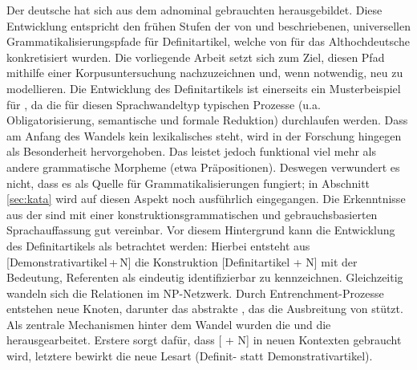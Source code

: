 Der deutsche  hat sich aus dem adnominal gebrauchten   herausgebildet. Diese Entwicklung entspricht den frühen Stufen der von \textcite{Greenberg1978} und \textcite{Lehmann2015} beschriebenen, universellen Grammatikalisierungspfade  für Definitartikel, welche von \textcite{Schmuck2014} für das Althochdeutsche konkretisiert wurden. Die vorliegende Arbeit setzt sich zum Ziel, diesen Pfad mithilfe einer Korpusuntersuchung  nachzuzeichnen und, wenn notwendig, neu zu modellieren. Die Entwicklung  des Definitartikels ist einerseits ein Musterbeispiel für , da die für diesen Sprachwandeltyp typischen Prozesse (u.a. Obligatorisierung, semantische und formale Reduktion)  durchlaufen werden. Dass am Anfang des Wandels kein lexikalisches  steht, wird in der Forschung hingegen als Besonderheit hervorgehoben. Das  leistet jedoch funktional viel mehr als andere grammatische Morpheme  (etwa Präpositionen). Deswegen verwundert es nicht, dass es als Quelle für Grammatikalisierungen  fungiert; in Abschnitt \ref{sec:kata} wird auf diesen Aspekt noch ausführlich eingegangen. Die Erkenntnisse aus der  sind mit einer konstruktionsgrammatischen  und gebrauchsbasierten Sprachauffassung gut vereinbar. Vor diesem Hintergrund kann die Entwicklung des Definitartikels als  betrachtet werden: Hierbei entsteht aus [Demonstrativartikel\,+\,N] die Konstruktion   [Definitartikel + N] mit der Bedeutung, Referenten als eindeutig identifizierbar zu kennzeichnen. Gleichzeitig wandeln sich die Relationen im NP-Netzwerk. Durch Entrenchment-Prozesse  entstehen neue Knoten, darunter das abstrakte , das die Ausbreitung von  stützt. Als zentrale Mechanismen hinter dem Wandel wurden die  und die  herausgearbeitet. Erstere sorgt dafür, dass [ + N] in neuen Kontexten gebraucht wird, letztere bewirkt die neue Lesart (Definit- statt Demonstrativartikel).   
